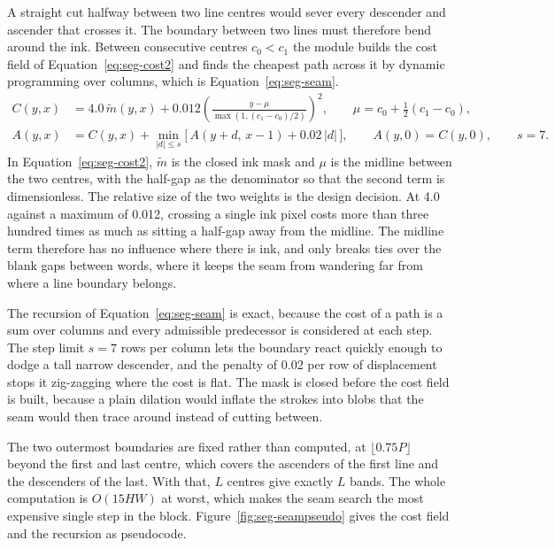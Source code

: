A straight cut halfway between two line centres would sever every descender and ascender that crosses it. The boundary between two lines must therefore bend around the ink. Between consecutive centres $c_0<c_1$ the module builds the cost field of Equation~\ref{eq:seg-cost2} and finds the cheapest path across it by dynamic programming over columns, which is Equation~\ref{eq:seg-seam}.
\begin{align}
C(y,x)&=4.0\,\tilde m(y,x)+0.012\left(\frac{y-\mu}{\max(1,(c_1-c_0)/2)}\right)^{\!2},\qquad \mu=c_0+\tfrac12(c_1-c_0),\label{eq:seg-cost2}\\
A(y,x)&=C(y,x)+\min_{|d|\le s}\bigl[\,A(y+d,\,x-1)+0.02\,|d|\,\bigr],\qquad A(y,0)=C(y,0),\qquad s=7.\label{eq:seg-seam}
\end{align}
In Equation~\ref{eq:seg-cost2}, $\tilde m$ is the closed ink mask and $\mu$ is the midline between the two centres, with the half-gap as the denominator so that the second term is dimensionless. The relative size of the two weights is the design decision. At 4.0 against a maximum of 0.012, crossing a single ink pixel costs more than three hundred times as much as sitting a half-gap away from the midline. The midline term therefore has no influence where there is ink, and only breaks ties over the blank gaps between words, where it keeps the seam from wandering far from where a line boundary belongs.

The recursion of Equation~\ref{eq:seg-seam} is exact, because the cost of a path is a sum over columns and every admissible predecessor is considered at each step. The step limit $s=7$ rows per column lets the boundary react quickly enough to dodge a tall narrow descender, and the penalty of 0.02 per row of displacement stops it zig-zagging where the cost is flat. The mask is closed before the cost field is built, because a plain dilation would inflate the strokes into blobs that the seam would then trace around instead of cutting between.

The two outermost boundaries are fixed rather than computed, at $\lfloor0.75P\rfloor$ beyond the first and last centre, which covers the ascenders of the first line and the descenders of the last. With that, $L$ centres give exactly $L$ bands. The whole computation is $O(15HW)$ at worst, which makes the seam search the most expensive single step in the block. Figure~\ref{fig:seg-seampseudo} gives the cost field and the recursion as pseudocode.

